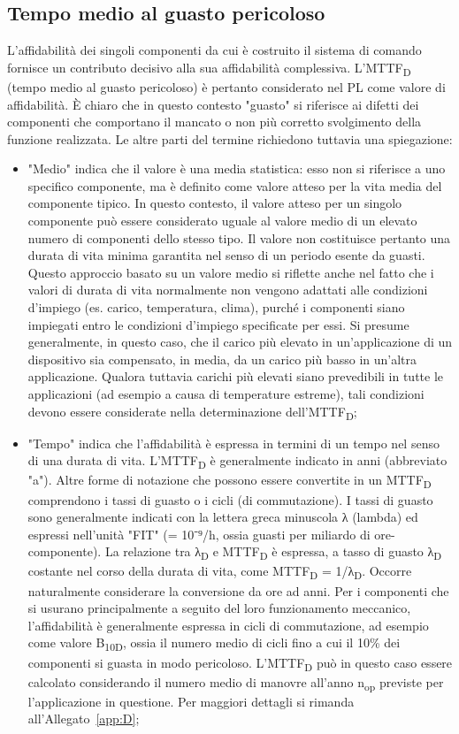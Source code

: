 \subsection{Tempo medio al guasto pericoloso}
\label{subsec:06-2-11}
L'affidabilità dei singoli componenti da cui è costruito il sistema di comando fornisce un contributo decisivo alla sua affidabilità complessiva. L'MTTF\textsubscript{D} (tempo medio al guasto pericoloso) è pertanto considerato nel PL come valore di affidabilità. È chiaro che in questo contesto "guasto" si riferisce ai difetti dei componenti che comportano il mancato o non più corretto svolgimento della funzione realizzata. Le altre parti del termine richiedono tuttavia una spiegazione:
\begin{itemize}
    \item "Medio" indica che il valore è una media statistica: esso non si riferisce a uno specifico componente, ma è definito come valore atteso per la vita media del componente tipico. In questo contesto, il valore atteso per un singolo componente può essere considerato uguale al valore medio di un elevato numero di componenti dello stesso tipo. Il valore non costituisce pertanto una durata di vita minima garantita nel senso di un periodo esente da guasti. Questo approccio basato su un valore medio si riflette anche nel fatto che i valori di durata di vita normalmente non vengono adattati alle condizioni d'impiego (es. carico, temperatura, clima), purché i componenti siano impiegati entro le condizioni d'impiego specificate per essi. Si presume generalmente, in questo caso, che il carico più elevato in un'applicazione di un dispositivo sia compensato, in media, da un carico più basso in un'altra applicazione. Qualora tuttavia carichi più elevati siano prevedibili in tutte le applicazioni (ad esempio a causa di temperature estreme), tali condizioni devono essere considerate nella determinazione dell'MTTF\textsubscript{D};
    \item "Tempo" indica che l'affidabilità è espressa in termini di un tempo nel senso di una durata di vita. L'MTTF\textsubscript{D} è generalmente indicato in anni (abbreviato "a"). Altre forme di notazione che possono essere convertite in un MTTF\textsubscript{D} comprendono i tassi di guasto o i cicli (di commutazione). I tassi di guasto sono generalmente indicati con la lettera greca minuscola λ (lambda) ed espressi nell'unità "FIT" (= 10⁻⁹/h, ossia guasti per miliardo di ore-componente). La relazione tra λ\textsubscript{D} e MTTF\textsubscript{D} è espressa, a tasso di guasto λ\textsubscript{D} costante nel corso della durata di vita, come MTTF\textsubscript{D} = 1/λ\textsubscript{D}. Occorre naturalmente considerare la conversione da ore ad anni. Per i componenti che si usurano principalmente a seguito del loro funzionamento meccanico, l'affidabilità è generalmente espressa in cicli di commutazione, ad esempio come valore B\textsubscript{10D}, ossia il numero medio di cicli fino a cui il 10\% dei componenti si guasta in modo pericoloso. L'MTTF\textsubscript{D} può in questo caso essere calcolato considerando il numero medio di manovre all'anno n\textsubscript{op} previste per l'applicazione in questione. Per maggiori dettagli si rimanda all'Allegato~\ref{app:D};

\end{itemize}
